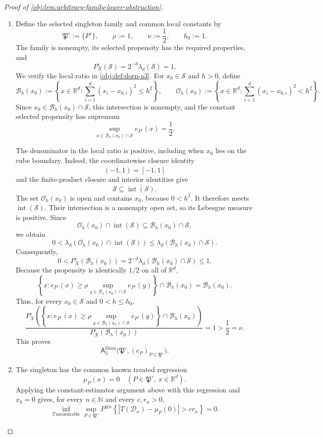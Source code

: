 \documentclass[11pt]{article}
\begin{document}
\begin{proof}[Proof of \cref{obj:lem:arbitrary-family-lower-obstruction}]
\begin{enumerate}
\item Define the selected singleton family and common local constants by
\[
\mathfrak P^\circ:=\{P^\circ\},
\qquad
\rho:=1,\qquad \nu:=\frac12,\qquad h_0:=1.
\]
The family is nonempty, its selected propensity has the required properties, and
\[
P_X^\circ(\mathcal S)=2^{-d}\lambda_d(\mathcal S)=1.
\]
We verify the local ratio in \cref{obj:def:dorn-a3}. For \(x_0\in\mathcal S\) and \(h>0\), define
\[
\mathcal B_h(x_0)
:=
\left\{x\in\mathbb R^d:
\sum_{i=1}^d(x_i-x_{0,i})^2\le h^2\right\},
\qquad
\mathcal O_h(x_0)
:=
\left\{x\in\mathbb R^d:
\sum_{i=1}^d(x_i-x_{0,i})^2<h^2\right\}.
\]
Since \(x_0\in\mathcal B_h(x_0)\cap\mathcal S\), this intersection is nonempty, and the constant selected propensity has supremum
\[
\sup_{x\in\mathcal B_h(x_0)\cap\mathcal S}e_{P^\circ}(x)
=\frac12.
\]

The denominator in the local ratio is positive, including when \(x_0\) lies on the cube boundary. Indeed, the coordinatewise closure identity
\[
\overline{(-1,1)}=[-1,1]
\]
and the finite-product closure and interior identities give
\[
\mathcal S\subseteq\overline{\operatorname{int}(\mathcal S)}.
\]
The set \(\mathcal O_h(x_0)\) is open and contains \(x_0\), because \(0<h^2\). It therefore meets \(\operatorname{int}(\mathcal S)\). Their intersection is a nonempty open set, so its Lebesgue measure is positive. Since
\[
\mathcal O_h(x_0)\cap\operatorname{int}(\mathcal S)
\subseteq
\mathcal B_h(x_0)\cap\mathcal S,
\]
we obtain
\[
0<
\lambda_d\!\left(
\mathcal O_h(x_0)\cap\operatorname{int}(\mathcal S)
\right)
\le
\lambda_d\!\left(\mathcal B_h(x_0)\cap\mathcal S\right).
\]
Consequently,
\[
0<
P_X^\circ(\mathcal B_h(x_0))
=
2^{-d}\lambda_d\!\left(\mathcal B_h(x_0)\cap\mathcal S\right)
\le1.
\]
Because the propensity is identically \(1/2\) on all of \(\mathbb R^d\),
\[
\left\{x:
e_{P^\circ}(x)\ge
\rho\sup_{y\in\mathcal B_h(x_0)\cap\mathcal S}e_{P^\circ}(y)
\right\}
\cap\mathcal B_h(x_0)
=
\mathcal B_h(x_0).
\]
Thus, for every \(x_0\in\mathcal S\) and \(0<h\le h_0\),
\[
\frac{
P_X^\circ\!\left(
\left\{x:
e_{P^\circ}(x)\ge
\rho\sup_{y\in\mathcal B_h(x_0)\cap\mathcal S}e_{P^\circ}(y)
\right\}
\cap\mathcal B_h(x_0)
\right)}
{P_X^\circ(\mathcal B_h(x_0))}
=1>\frac12=\nu.
\]
This proves
\[
\mathsf A_3^{\mathrm{Dorn}}
\bigl(\mathfrak P^\circ,(e_P)_{P\in\mathfrak P^\circ}\bigr).
\]

\item The singleton has the common known treated regression
\[
\mu_P(x)=0
\quad(P\in\mathfrak P^\circ,\ x\in\mathbb R^d).
\]
Applying the constant-estimator argument above with this regression and \(x_0=0\) gives, for every \(n\in\mathbb N\) and every \(c,r_n>0\),
\[
\inf_{T\ \mathrm{measurable}}
\sup_{P\in\mathfrak P^\circ}
P^{\otimes n}
\left\{
|T(\mathcal D_n)-\mu_P(0)|>c r_n
\right\}
=0.
\]
\end{enumerate}
\end{proof}
\end{document}
